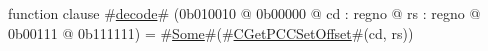 function clause #\hyperref[zdecode]{decode}# (0b010010 @ 0b00000 @ cd : regno @ rs : regno @    0b00111 @ 0b111111) = #\hyperref[zSome]{Some}#(#\hyperref[zCGetPCCSetOffset]{CGetPCCSetOffset}#(cd, rs))
